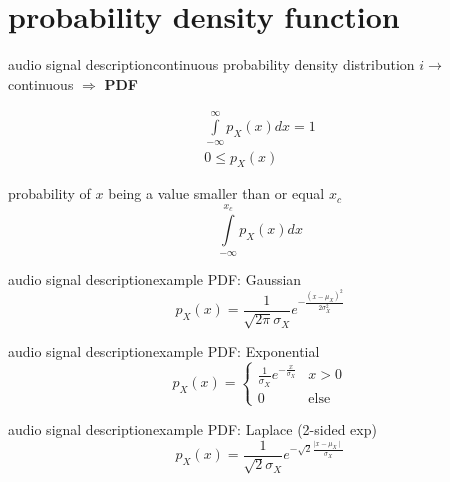 \section{probability density function}
\begin{frame}{audio signal description}{continuous probability density distribution}
	$i\rightarrow$ continuous $\Rightarrow$ \textbf{PDF} 

	\pause
	\begin{eqnarray*}
		\int\limits_{-\infty}^{\infty} p_X(x)dx = 1\\
		0 \leq p_X(x)
	\end{eqnarray*}		

	\pause
	probability of $x$ being a value smaller than or equal $x_c$
				\begin{equation*}
					\int\limits_{-\infty}^{x_c} p_X(x)dx
				\end{equation*}		
\end{frame}	
	
\begin{frame}{audio signal description}{example PDF: Gaussian}
    \vspace{-5mm}
	\begin{equation*} \label{gaussverteilung}
		p_X(x)= \frac{1}{\sqrt{2\pi}\sigma_X}e^{-\frac{(x-\mu_X)^2}{2\sigma_X^2}}
	\end{equation*}
\end{frame}	

\begin{frame}{audio signal description}{example PDF: Exponential}
    \vspace{-5mm}
	\begin{equation*}
		p_X(x)= \left\lbrace  \begin{array}{ll}
		  \frac{1}{\sigma_X}e^{-\frac{x}{\sigma_X}} & x >0 \\
		  0 & \textrm{else} 
	\end{array}\right.
	\end{equation*}
\end{frame}	
	
\begin{frame}{audio signal description}{example PDF: Laplace (2-sided exp)}
    \vspace{-5mm}
	\begin{equation*}
		p_X(x)= \frac{1}{\sqrt{2}\sigma_X}e^{-\sqrt{2}\frac{\mid x-\mu_X\mid}{\sigma_X}}
	\end{equation*}
\end{frame}	
	
